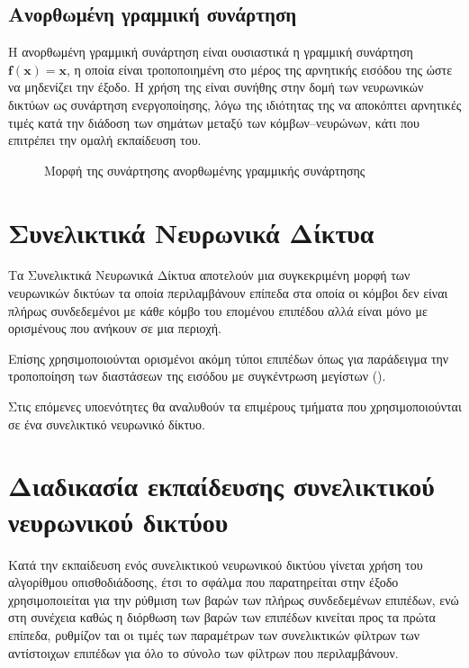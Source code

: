 \subsection{Ανορθωμένη γραμμική συνάρτηση }
Η ανορθωμένη γραμμική συνάρτηση  είναι ουσιαστικά η γραμμική συνάρτηση $\mathit{\mathbf{f\left(x\right) = x}}$, η οποία είναι τροποποιημένη στο μέρος της αρνητικής εισόδου της ώστε να μηδενίζει την έξοδο. Η χρήση της είναι συνήθης στην δομή των νευρωνικών δικτύων ως συνάρτηση ενεργοποίησης, λόγω της ιδιότητας της να αποκόπτει αρνητικές τιμές κατά την διάδοση των σημάτων μεταξύ των κόμβων--νευρώνων, κάτι που επιτρέπει την ομαλή εκπαίδευση του.

\begin{figure}[H]
  \begin{center}
    
    \caption{Μορφή της συνάρτησης ανορθωμένης γραμμικής συνάρτησης }
  \end{center}
\end{figure}

\section{Συνελικτικά Νευρωνικά Δίκτυα}
Τα Συνελικτικά Νευρωνικά Δίκτυα αποτελούν μια συγκεκριμένη μορφή των νευρωνικών δικτύων τα οποία περιλαμβάνουν επίπεδα στα οποία οι κόμβοι δεν είναι πλήρως συνδεδεμένοι με κάθε κόμβο του επομένου επιπέδου αλλά είναι μόνο με ορισμένους που ανήκουν σε μια περιοχή. 

Επίσης χρησιμοποιούνται ορισμένοι ακόμη τύποι επιπέδων όπως για παράδειγμα την τροποποίηση των διαστάσεων της εισόδου με συγκέντρωση μεγίστων ().

Στις επόμενες υποενότητες θα αναλυθούν τα επιμέρους τμήματα που χρησιμοποιούνται σε ένα συνελικτικό νευρωνικό δίκτυο.

\section{Διαδικασία εκπαίδευσης συνελικτικού νευρωνικού δικτύου}
Κατά την εκπαίδευση ενός συνελικτικού νευρωνικού δικτύου γίνεται χρήση του αλγορίθμου οπισθοδιάδοσης, έτσι το σφάλμα που παρατηρείται στην έξοδο χρησιμοποιείται για την ρύθμιση των βαρών των πλήρως συνδεδεμένων επιπέδων, ενώ στη συνέχεια καθώς η διόρθωση των βαρών των επιπέδων κινείται προς τα πρώτα επίπεδα, ρυθμίζον ται οι τιμές των παραμέτρων των συνελικτικών φίλτρων των αντίστοιχων επιπέδων για όλο το σύνολο των φίλτρων που περιλαμβάνουν.\\

